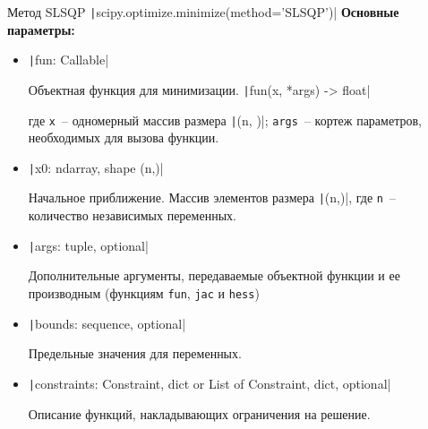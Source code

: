 \documentclass[aspectratio=169, mathserif]{beamer}%
\begin{document}
\begin{frame}[fragile, label=c]{Метод SLSQP}
\scriptsize
\texttt|scipy.optimize.minimize(method='SLSQP')|
\vfill
\textbf{Основные параметры:}
\vfill
\begin{itemize}
\item[] \texttt|fun: Callable|

Объектная функция для минимизации.
\vfill
\texttt|fun(x, *args) -> float|

где \texttt{x}~-- одномерный массив размера \texttt|(n, )|; \texttt{args}~-- кортеж параметров, необходимых для вызова функции.
\vfill
\item[] \texttt|x0: ndarray, shape (n,)|

Начальное приближение. Массив элементов размера \texttt|(n,)|, где \texttt{n}~-- количество независимых переменных.
\vfill
\item[] \texttt|args: tuple, optional|

Дополнительные аргументы, передаваемые объектной функции и ее производным (функциям \texttt{fun}, \texttt{jac} и \texttt{hess})
\vfill
\item[] \texttt|bounds: sequence, optional|

Предельные значения для переменных.
\vfill
\item[] \texttt|constraints: {Constraint, dict} or List of {Constraint, dict}, optional|

Описание функций, накладывающих ограничения на решение.
\end{itemize}
\vfill
\end{frame}
\end{document}
